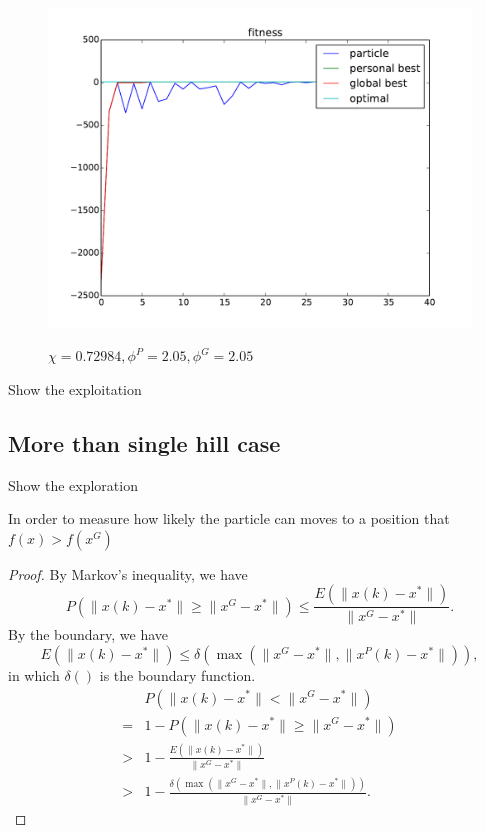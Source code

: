 \begin{figure}[ht]
\centering
\includegraphics[width=.7\linewidth]{./simfig/case1/fitness1-2} 
\label{fig:case1-2:fitness} 
\caption{$ \chi = 0.72984 , \phi^{P} = 2.05 , \phi^{G} = 2.05 $ }
\end{figure}

Show the exploitation


\subsection{More than single hill case}

Show the exploration

In order to measure how likely the particle can moves to a position that $ f(x) > f(x^{G}) $

\begin{mylem}

\begin{proof}
By Markov's inequality, we have
\begin{equation}
P( \lVert x(k) - x^{*} \rVert \geq \lVert x^{G} - x^{*} \rVert ) \leq \frac{ E( \lVert x(k) - x^{*} \rVert ) }{ \lVert x^{G} - x^{*} \rVert }.
\end{equation} 
By the boundary, we have
\begin{equation}
E( \lVert x(k) - x^{*} \rVert ) \leq \delta ( \max ( \lVert x^{G} - x^{*} \rVert , \lVert x^{P}(k) - x^{*}  \rVert ) ),
\end{equation}
in which $ \delta () $ is the boundary function.
\begin{equation}
\begin{aligned}
& P( \lVert x(k) - x^{*} \rVert < \lVert x^{G} - x^{*} \rVert ) \\
= & 1 - P( \lVert x(k) - x^{*} \rVert \geq \lVert x^{G} - x^{*} \rVert ) \\
> & 1 - \frac{ E( \lVert x(k) - x^{*} \rVert ) }{ \lVert x^{G} - x^{*} \rVert } \\
> & 1 - \frac{ \delta ( \max ( \lVert x^{G} - x^{*} \rVert , \lVert x^{P}(k) - x^{*}  \rVert ) ) }{ \lVert x^{G} - x^{*} \rVert }.
\end{aligned}
\end{equation}
\end{proof}
\end{mylem}

